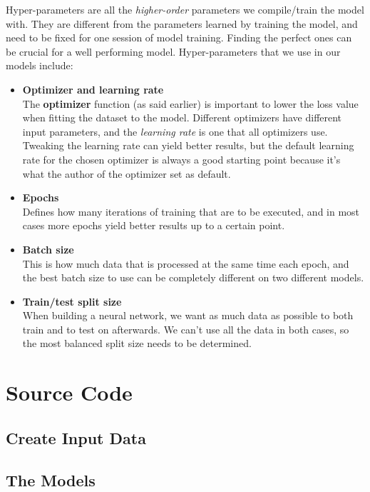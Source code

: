 Hyper-parameters are all the \textit{higher-order} parameters we compile/train the model with. They are different from the parameters learned by
training the model, and need to be fixed for one session of model training. Finding the perfect ones can be crucial for a well performing model. 
Hyper-parameters that we use in our models include:

\begin{itemize}
    \item \textbf{Optimizer and learning rate}\\
        The \textbf{optimizer} function (as said earlier) is important to lower the loss value when fitting the dataset to the model. 
        Different optimizers have different input parameters, and the \textit{learning rate} is one that all optimizers use. 
        Tweaking the learning rate can yield better results, but the default learning rate for the chosen optimizer is always a good starting point because
        it's what the author of the optimizer set as default.
    \item \textbf{Epochs}\\
        Defines how many iterations of training that are to be executed, and in most cases more epochs yield better results up to a certain point.
    \item \textbf{Batch size}\\
        This is how much data that is processed at the same time each epoch, and the best batch size to use can be completely different on 
        two different models. 
    \item \textbf{Train/test split size}\\
        When building a neural network, we want as much data as possible to both train and to test on afterwards. We can't use all the data 
        in both cases, so the most balanced split size needs to be determined.
\end{itemize}

\newpage

\section{Source Code}
\subsection{Create Input Data}


\newpage
\subsection{The Models}


